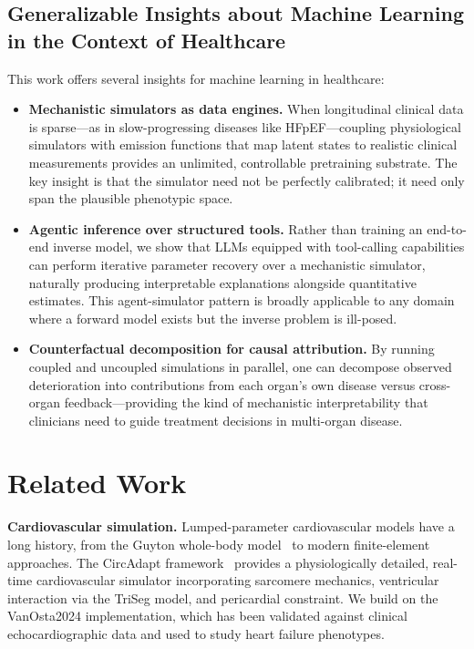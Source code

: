 \documentclass[pmlr]{jmlr}
\begin{document}
\subsection*{Generalizable Insights about Machine Learning in the Context of Healthcare}

This work offers several insights for machine learning in healthcare:

\begin{itemize}
\item \textbf{Mechanistic simulators as data engines.} When longitudinal clinical data is sparse---as in slow-progressing diseases like HFpEF---coupling physiological simulators with emission functions that map latent states to realistic clinical measurements provides an unlimited, controllable pretraining substrate. The key insight is that the simulator need not be perfectly calibrated; it need only span the plausible phenotypic space.

\item \textbf{Agentic inference over structured tools.} Rather than training an end-to-end inverse model, we show that LLMs equipped with tool-calling capabilities can perform iterative parameter recovery over a mechanistic simulator, naturally producing interpretable explanations alongside quantitative estimates. This agent-simulator pattern is broadly applicable to any domain where a forward model exists but the inverse problem is ill-posed.

\item \textbf{Counterfactual decomposition for causal attribution.} By running coupled and uncoupled simulations in parallel, one can decompose observed deterioration into contributions from each organ's own disease versus cross-organ feedback---providing the kind of mechanistic interpretability that clinicians need to guide treatment decisions in multi-organ disease.
\end{itemize}


\section{Related Work}

\textbf{Cardiovascular simulation.}
Lumped-parameter cardiovascular models have a long history, from the Guyton whole-body model~\citep{guyton1972} to modern finite-element approaches. The CircAdapt framework~\citep{arts2005,walmsley2015,vanosta2024} provides a physiologically detailed, real-time cardiovascular simulator incorporating sarcomere mechanics, ventricular interaction via the TriSeg model, and pericardial constraint. We build on the VanOsta2024 implementation, which has been validated against clinical echocardiographic data and used to study heart failure phenotypes.
\end{document}
